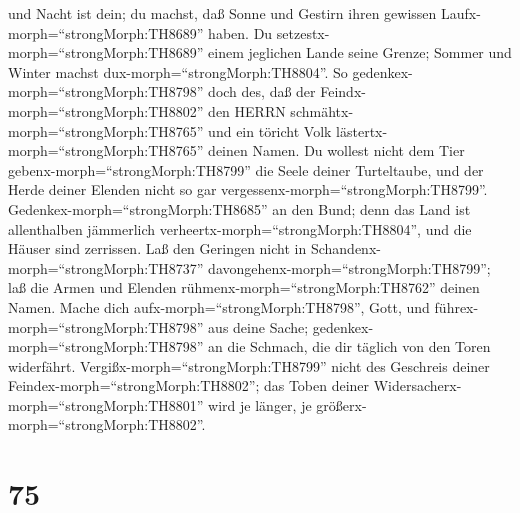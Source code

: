 und Nacht ist dein; du machst, daß Sonne und Gestirn ihren gewissen
Laufx-morph=``strongMorph:TH8689'' haben.  Du
setzestx-morph=``strongMorph:TH8689'' einem jeglichen Lande seine
Grenze; Sommer und Winter machst dux-morph=``strongMorph:TH8804''.
 So gedenkex-morph=``strongMorph:TH8798'' doch des, daß der
Feindx-morph=``strongMorph:TH8802'' den HERRN
schmähtx-morph=``strongMorph:TH8765'' und ein töricht Volk
lästertx-morph=``strongMorph:TH8765'' deinen Namen.  Du
wollest nicht dem Tier gebenx-morph=``strongMorph:TH8799'' die Seele
deiner Turteltaube, und der Herde deiner Elenden nicht so gar
vergessenx-morph=``strongMorph:TH8799''. 
Gedenkex-morph=``strongMorph:TH8685'' an den Bund; denn das Land ist
allenthalben jämmerlich verheertx-morph=``strongMorph:TH8804'', und die
Häuser sind zerrissen.  Laß den Geringen nicht in
Schandenx-morph=``strongMorph:TH8737''
davongehenx-morph=``strongMorph:TH8799''; laß die Armen und Elenden
rühmenx-morph=``strongMorph:TH8762'' deinen Namen.  Mache
dich aufx-morph=``strongMorph:TH8798'', Gott, und
führex-morph=``strongMorph:TH8798'' aus deine Sache;
gedenkex-morph=``strongMorph:TH8798'' an die Schmach, die dir täglich
von den Toren widerfährt. 
Vergißx-morph=``strongMorph:TH8799'' nicht des Geschreis deiner
Feindex-morph=``strongMorph:TH8802''; das Toben deiner
Widersacherx-morph=``strongMorph:TH8801'' wird je länger, je
größerx-morph=``strongMorph:TH8802''.

\hypertarget{section-74}{%
\section{75}\label{section-74}}

